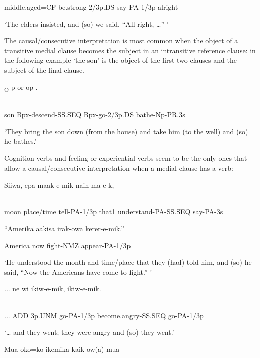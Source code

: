 middle.aged=CF  be.strong-2/3p.DS  say-PA-1/3p  alright

`The elders insisted, and (so) we said, ``All right, {\dots}'' '

The causal/consecutive interpretation is most common when the object of a transitive medial clause becomes the subject in an intransitive reference clause: in the following example `the son' is the object of the first two clauses and the subject of the final clause.

\ea%
\label{ex:x1504}
\textsubscript{O}  p-or-op    . \\
      \\
\glt
\z

son  Bpx-descend-SS.SEQ  Bpx-go-2/3p.DS  bathe-Np-PR.3s

`They bring the son down (from the house) and take him (to the well) and (so) he bathes.'

Cognition verbs and feeling or experiential verbs seem to be the only ones that allow a causal/consecutive interpretation when a medial clause has a  verb:

\ea%
\label{ex:x1440}
\gll Siiwa,  epa  maak-e-mik  nain    ma-e-k,  \\
      \\
\glt
\z

moon  place/time  tell-PA-1/3p  that1  understand-PA-SS.SEQ  say-PA-3s

``Amerika  aakisa  irak-owa  kerer-e-mik.''

America  now  fight-NMZ  appear-PA-1/3p

`He understood the month and time/place that they (had) told him, and (so) he said, ``Now the Americans have come to fight.'' '

\ea%
\label{ex:x1441}
\gll ...  ne  wi  ikiw-e-mik,    ikiw-e-mik. \\
      \\
\glt
\z

...  ADD  3p.UNM  go-PA-1/3p  become.angry-SS.SEQ  go-PA-1/3p

`{\dots} and they went; they were angry and (so) they went.'

\ea%
\label{ex:x1484}
\gll Mua  oko=ko    ikemika  kaik-ow(a)  mua \\
      \\
\glt
\z

